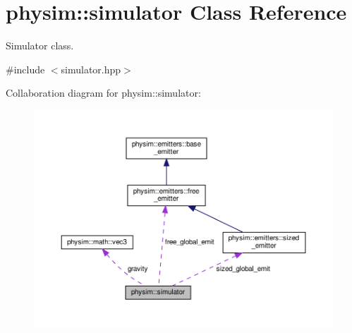\hypertarget{classphysim_1_1simulator}{}\section{physim\+:\+:simulator Class Reference}
\label{classphysim_1_1simulator}


Simulator class.  




{\ttfamily \#include $<$simulator.\+hpp$>$}



Collaboration diagram for physim\+:\+:simulator\+:\nopagebreak
\begin{figure}[H]
\begin{center}
\leavevmode
\includegraphics[width=350pt]{classphysim_1_1simulator__coll__graph}
\end{center}
\end{figure}
